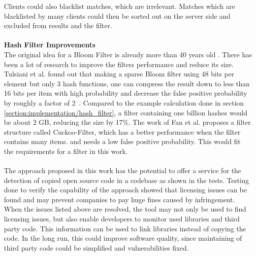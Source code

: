 Clients could also blacklist matches, which are irrelevant.
Matches which are blacklisted by many clients could then be sorted out on the server side and excluded from results and the filter.\\
\\
\textbf{Hash Filter Improvements}\\
The original idea for a Bloom Filter is already more than 40 years old \cite{bloom1970filter}.
There has been a lot of research to improve the filters performance and reduce its size.
Tulsiani et al. found out that \glqq making a sparse Bloom filter using 48 bits per element but only 3 hash functions, one can compress the result down to less than 16 bits per item with high probability and decrease the false positive probability by roughly a factor of 2\grqq \ \cite{tulsiani2013probability}.
Compared to the example calculation done in section \ref{section:implementation/hash_filter}, a filter containing one billion hashes would be about 2 GB, reducing the size by 17\%.
The work of Fan et al. proposes a filter structure called Cuckoo-Filter, which has a better performance when the filter contains many items. and needs a low false positive probability.
This would fit the requirements for a filter in this work.\\
\\
The approach proposed in this work has the potential to offer a service for the detection of copied open source code in a codebase as shown in the tests.
Testing done to verify the capability of the approach showed that licensing issues can be found and may prevent companies to pay huge fines caused by infringement.
When the issues listed above are resolved, the tool may not only be used to find licensing issues, but also enable developers to monitor used libraries and third party code.
This information can be used to link libraries instead of copying the code.
In the long run, this could improve software quality, since maintaining of third party code could be simplified and vulnerabilities fixed.

